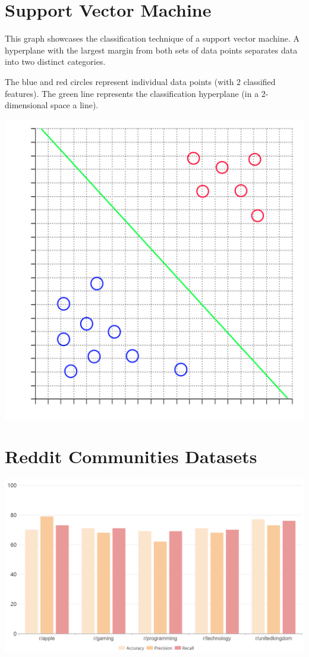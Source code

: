 \documentclass[12pt,journal,compsoc]{IEEEtran}
\begin{document}
\section{Support Vector Machine}
This graph showcases the classification technique of a support vector machine. A hyperplane with the largest margin from both sets of data points separates data into two distinct categories.

The blue and red circles represent individual data points (with 2 classified features). The green line represents the classification hyperplane (in a 2-dimensional space a line).
\begin{center}
  \includegraphics[scale=1.2]{support-vector-machine-showcase-graph.png}
\end{center}

\section{Reddit Communities Datasets}
\begin{center}
  \includegraphics[scale=0.24]{reddit-communities-datasets.png}
\end{center}
\end{document}
